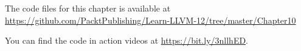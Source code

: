 The code files for this chapter is available at  \url{https://github.com/PacktPublishing/Learn-LLVM-12/tree/master/Chapter10}\par

You can find the code in action videos at \url{https://bit.ly/3nllhED}.\par